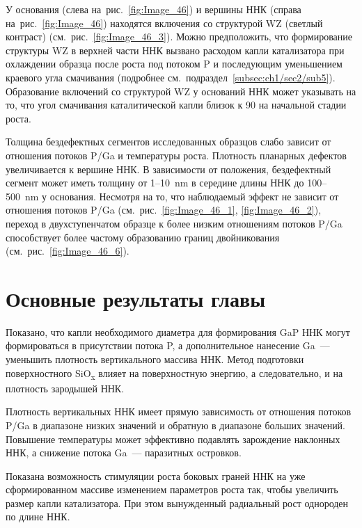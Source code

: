 У основания (слева на~рис.~\cref{fig:Image_46}) и вершины ННК (справа
на~рис.~\cref{fig:Image_46}) находятся включения со структурой WZ (светлый
контраст) (см.~рис.~\cref{fig:Image_46_3}). Можно предположить, что
формирование структуры WZ в верхней части ННК вызвано расходом капли
катализатора при охлаждении образца после роста под потоком P и последующим
уменьшением краевого угла смачивания (подробнее
см.~подраздел~\cref{subsec:ch1/sec2/sub5}). Образование включений со структурой
WZ у оснований ННК может указывать на то, что угол смачивания каталитической
капли близок к 90{\textdegree} на начальной стадии роста.

Толщина бездефектных сегментов исследованных образцов слабо зависит от
отношения потоков P/Ga и температуры роста. Плотность планарных дефектов
увеличивается к вершине ННК. В зависимости от положения, бездефектный сегмент
может иметь толщину от 1--10~\si{\nano\meter} в середине длины ННК до
100--500~\si{\nano\meter} у основания. Несмотря на то, что наблюдаемый эффект
не зависит от отношения потоков P/Ga (см.~рис.~\cref{fig:Image_46_1},
\cref{fig:Image_46_2}), переход в двухступенчатом образце к более низким
отношениям потоков P/Ga способствует более частому образованию границ
двойникования (см.~рис.~\cref{fig:Image_46_6}).

\section{Основные результаты главы}\label{sec:ch6/sec3}

Показано, что капли необходимого диаметра для формирования GaP ННК могут
формироваться в присутствии потока P, а дополнительное нанесение Ga~---
уменьшить плотность вертикального массива ННК. Метод подготовки поверхностного
SiO\textsubscript{x} влияет на поверхностную энергию, а следовательно, и на
плотность зародышей ННК.

Плотность вертикальных ННК имеет прямую зависимость от отношения потоков P/Ga в
диапазоне низких значений и обратную в диапазоне больших значений. Повышение
температуры может эффективно подавлять зарождение наклонных ННК, а снижение
потока Ga~--- паразитных островков.

Показана возможность стимуляции роста боковых граней ННК на уже сформированном
массиве изменением параметров роста так, чтобы увеличить размер капли
катализатора. При этом вынужденный радиальный рост однороден по длине ННК.

\FloatBarrier
